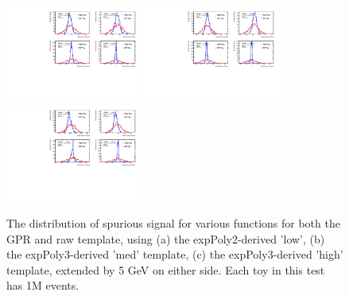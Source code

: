 \begin{figure} 
\begin{center}
  \includegraphics[width=0.4\textwidth]{figures/background/gpr/validation/padded/ToyTest_FitSigVals_lowpT_1M_noSig}   
  \includegraphics[width=0.4\textwidth]{figures/background/gpr/validation/padded/ToyTest_FitSigVals_medpT_1M_noSig}   
  \includegraphics[width=0.4\textwidth]{figures/background/gpr/validation/padded/ToyTest_FitSigVals_highpT_1M_noSig}   
\caption{The distribution of spurious signal for various functions for both the GPR and raw template, using (a) the expPoly2-derived 'low', (b) the expPoly3-derived 'med' template, (c) the expPoly3-derived 'high' template, extended by 5 GeV on either side. Each toy in this test has 1M events.}
\label{fig:padded_lowpt_1M_noSig}
\end{center}
\end{figure}

